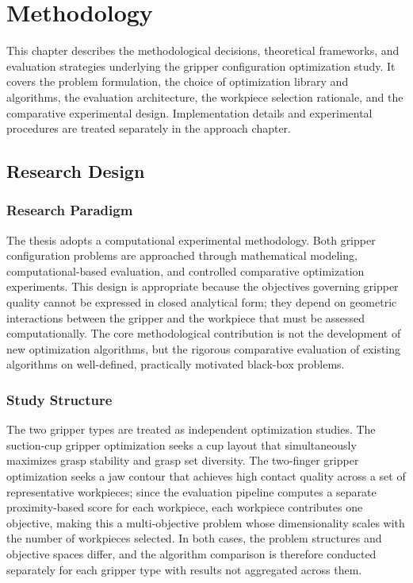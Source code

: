 \chapter{Methodology}
\label{chap:methodology}

This chapter describes the methodological decisions, theoretical frameworks, and evaluation strategies underlying the gripper configuration
optimization study. It covers the problem formulation, the choice of optimization library and algorithms, the evaluation architecture, the workpiece
selection rationale, and the comparative experimental design. Implementation details and experimental procedures are treated separately in the
approach chapter.

\section{Research Design}
\label{sec:research_design}

\subsection{Research Paradigm}
\label{subsec:research_paradigm}

The thesis adopts a computational experimental methodology. Both gripper configuration problems are approached through mathematical modeling,
computational-based evaluation, and controlled comparative optimization experiments. This design is appropriate because the objectives governing
gripper quality cannot be expressed in closed analytical form; they depend on geometric interactions between the gripper and the workpiece that must
be assessed computationally. The core methodological contribution is not the development of new optimization algorithms, but the rigorous comparative
evaluation of existing algorithms on well-defined, practically motivated black-box problems.

\subsection{Study Structure}
\label{subsec:study_structure}

The two gripper types are treated as independent optimization studies. The suction-cup gripper optimization seeks a cup layout that simultaneously
maximizes grasp stability and grasp set diversity. The two-finger gripper optimization seeks a jaw contour that achieves high contact quality across a
set of representative workpieces; since the evaluation pipeline computes a separate proximity-based score for each workpiece, each workpiece
contributes one objective, making this a multi-objective problem whose dimensionality scales with the number of workpieces selected. In both cases,
the problem structures and objective spaces differ, and the algorithm comparison is therefore conducted separately for each gripper type with results
not aggregated across them.

